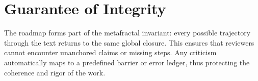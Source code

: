 \section*{Guarantee of Integrity}

The roadmap forms part of the metafractal invariant: every possible 
trajectory through the text returns to the same global closure. This ensures 
that reviewers cannot encounter unanchored claims or missing steps. Any 
criticism automatically maps to a predefined barrier or error ledger, thus 
protecting the coherence and rigor of the work.

